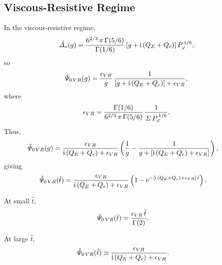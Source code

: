 \documentclass[titlepage=false,12pt]{article}
\begin{document}
\subsection{Viscous-Resistive Regime}
In the viscous-resistive regime, 
\begin{equation}
\hat{\mit\Delta}_s(g) = \frac{6^{2/3}\,\pi\,\Gamma(5/6)}{\Gamma(1/6)}\,[g+ {\rm i}\,(Q_E+Q_e)]\,P_\varphi^{\,1/6},
\end{equation}
so
\begin{equation}
\tilde{\mit\Psi}_{0\,VR}(g) =\frac{\epsilon_{VR}}{g}\,\frac{1}{[g+ {\rm i}\,(Q_E+Q_e)]+\epsilon_{VR}},
\end{equation}
where
\begin{equation}
\epsilon_{VR} = \frac{\Gamma(1/6)}{6^{2/3}\,\pi\,\Gamma(5/6)}\,\frac{1}{{\mit\Sigma}\,P_\varphi^{\,1/6}}.
\end{equation}
Thus,
\begin{align}
\tilde{\mit\Psi}_{0\,VR}(g) &= 
\frac{\epsilon_{VR}}{{\rm i}\,(Q_E+Q_e)+\epsilon_{VR}}\left(\frac{1}{g} - \frac{1}{g +[ {\rm i}\,(Q_E+Q_e)+\epsilon_{VR}]}\right),
\end{align}
giving
\begin{align}
\hat{\mit\Psi}_{0\,VR}(\hat{t}) &= \frac{\epsilon_{VR}}{{\rm i}\,(Q_E+Q_e)+\epsilon_{VR}}\left(1 - {\rm e}^{- [{\rm i}\,(Q_E+Q_e)+\epsilon_{VR}]\,\hat{t}}\right).
\end{align}

At small $\hat{t}$,
\begin{align}
\hat{\mit\Psi}_{0\,VR}(\hat{t}) &\simeq \frac{\epsilon_{VR}\,\hat{t}}{\Gamma(2)}.
\end{align}

At large $\hat{t}$, 
\begin{align}
\hat{\mit\Psi}_{0\,VR}(\hat{t}) &\simeq 
\frac{\epsilon_{VR}}{{\rm i}\,(Q_E+Q_e)+\epsilon_{VR}}.
\end{align}
\end{document}
